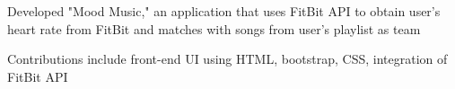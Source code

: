 \documentclass[]{deedy-resume-openfont}
\begin{document}
\begin{minipage}[t]{0.67\textwidth}
\descript{}
\begin{tightemize}
\item Developed "Mood Music," an application that uses FitBit API to obtain user's heart rate from FitBit and matches with songs from user's playlist as team
\item Contributions include front-end UI using HTML, bootstrap, CSS, integration of FitBit API
\end{tightemize}
\sectionsep

\end{minipage} 
\end{document}
